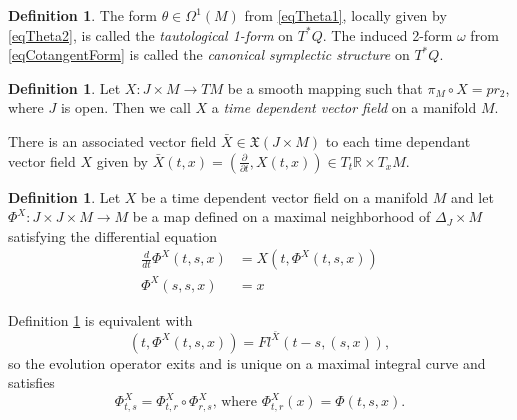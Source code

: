 \documentclass{article}
\numberwithin{theorem}{section}
\theoremstyle{definition}
\newtheorem{definition}[theorem]{Definition}
\begin{document}
\begin{definition}
    The form $\theta \in \Omega^1(M)$ from \eqref{eqTheta1}, locally given by \eqref{eqTheta2}, is called the \textit{tautological 1-form} on $T^*Q$. The induced 2-form $\omega$ from \eqref{eqCotangentForm} is called the \textit{canonical symplectic structure} on $T^*Q$.
\end{definition}    

\begin{definition}
    Let $X: J \times M \rightarrow TM$ be a smooth mapping such that $\pi_M \circ X = pr_2$, where $J$ is open. Then we call $X$ a \textit{time dependent vector field} on a manifold $M$.

    There is an associated vector field $\bar{X} \in \mathfrak{X}(J \times M)$ to each time dependant vector field $X$ given by $\bar{X}(t, x)=(\frac{\partial}{\partial t}, X(t,x)) \in T_t\mathbb{R}\times T_xM$. 
\end{definition}

\begin{definition} \label{defEvolutionOperator}
    Let $X$ be a time dependent vector field on a manifold $M$ and let $\Phi^X: J \times J \times M \rightarrow M$ be a map defined on a maximal neighborhood of $\Delta_J\times M$ satisfying the differential equation
    \begin{equation}
        \begin{split}
            \frac{d}{d t} \Phi^X(t, s, x)&=X\left(t, \Phi^X(t, s, x)\right) \\ 
            \Phi^X(s,s,x) &= x
        \end{split}
    \end{equation}
\end{definition}
Definition \ref{defEvolutionOperator} is equivalent with 
\begin{equation*}
    (t,\Phi^X(t,s,x)) = Fl^{\bar{X}}(t-s, (s,x)),
\end{equation*}
so the evolution operator exits and is unique on a maximal integral curve and satisfies
\begin{equation*}
    \Phi_{t, s}^X=\Phi_{t, r}^X \circ \Phi_{r, s}^X \text{, where }\Phi_{t, r}^X(x) = \Phi(t,s,x).
\end{equation*}
\end{document}

